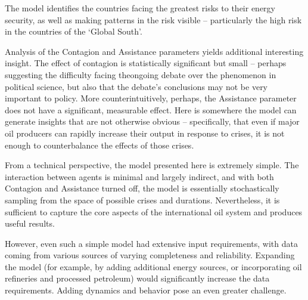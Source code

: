 \documentclass{article}
\begin{document}
The model identifies the countries facing the greatest risks to their energy security, as well as making patterns in the risk visible -- particularly the high risk in the countries of the `Global South'. 

Analysis of the Contagion and Assistance parameters yields additional interesting insight. The effect of contagion is statistically significant but small -- perhaps suggesting the difficulty facing theongoing debate over the phenomenon in political science, but also that the debate's conclusions may not be very important to policy. More counterintuitively, perhaps, the Assistance parameter does not have a significant, measurable effect. Here is somewhere the model can generate insights that are not otherwise obvious -- specifically, that even if major oil producers can rapidly increase their output in response to crises, it is not enough to counterbalance the effects of those crises. 

From a technical perspective, the model presented here is extremely simple. The interaction between agents is minimal and largely indirect, and with both Contagion and Assistance turned off, the model is essentially stochastically sampling from the space of possible crises and durations. Nevertheless, it is sufficient to capture the core aspects of the international oil system and produces useful results. 

However, even such a simple model had extensive input requirements, with data coming from various sources of varying completeness and reliability. Expanding the model (for example, by adding additional energy sources, or incorporating oil refineries and processed petroleum) would significantly increase the data requirements. Adding dynamics and behavior pose an even greater challenge. 




\end{document}
